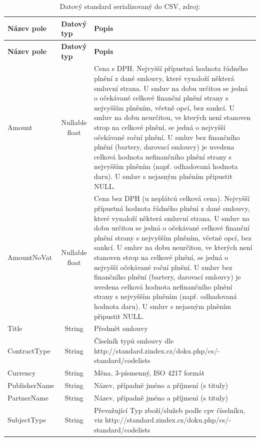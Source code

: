 \begin{center}
\begin{longtable}{lcp{65mm}}
\label{grid_csv} \\
\multicolumn{1}{l}{\textbf{Název pole}} & 
\multicolumn{1}{l}{\textbf{Datový typ}} & 
\multicolumn{1}{l}{\textbf{Popis}} \\ \hline 
\endfirsthead
\multicolumn{1}{l}{\textbf{Název pole}} & 
\multicolumn{1}{l}{\textbf{Datový typ}} & 
\multicolumn{1}{l}{\textbf{Popis}} \\ \hline 
\hline
\endhead
\endfoot
\caption{Datový standard serializovaný do CSV, zdroj:\protect\cite{metodika}}
\endlastfoot
\rowcolor{validateC}Amount & Nullable float & Cena s DPH. Nejvyšší přípustná hodnota řádného plnění z dané smlouvy, které vynaloží některá smluvní strana. U smluv na dobu určitou se jedná o očekávané celkové finanční plnění strany s nejvyšším plněním, včetně opcí, bez sankcí. U smluv na dobu neurčitou, ve kterých není stanoven strop na celkové plnění, se jedná o nejvyšší očekávané roční plnění. U smluv bez finančního plnění (bartery, darovací smlouvy) je uvedena celková hodnota nefinančního plnění strany s nejvyšším plněním (např. odhadovaná hodnota daru). U smluv s nejasným plněním připustit NULL. \\
\rowcolor{validateC}AmountNoVat & Nullable float & Cena bez DPH (u neplátců celková cena). Nejvyšší přípustná hodnota řádného plnění z dané smlouvy, které vynaloží některá smluvní strana. U smluv na dobu určitou se jedná o očekávané celkové finanční plnění strany s nejvyšším plněním, včetně opcí, bez sankcí. U smluv na dobu neurčitou, ve kterých není stanoven strop na celkové plnění, se jedná o nejvyšší očekávané roční plnění. U smluv bez finančního plnění (bartery, darovací smlouvy) je uvedena celková hodnota nefinančního plnění strany s nejvyšším plněním (např. odhadovaná hodnota daru). U smluv s nejasným plněním připustit NULL. \\
\rowcolor{validateC}Title & String & Předmět smlouvy \\
ContractType & String & Číselník typů smlouvy dle http://standard.zindex.cz/doku.php/cs/- standard/codelists \\
Currency & String & Měna, 3-písmenný, ISO 4217 formát \\
\rowcolor{validateC}PublisherName & String & Název, případně jméno a příjmení (s tituly) \\
\rowcolor{validateC}PartnerName &String & Název, případně jméno a příjmení (s tituly) \\
SubjectType & String & Převažující Typ zboží/služeb podle cpv číselníku, viz http://standard.zindex.cz/doku.php/cs/- standard/codelists \\

\end{longtable}
\end{center}

